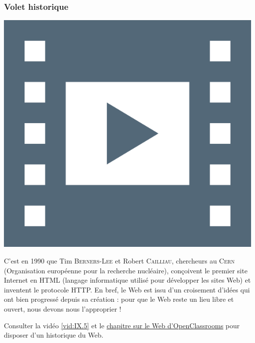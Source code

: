 \subsubsection[Volet historique]{Volet historique}
\label{subsub:IX.2.1.2}

\begin{marginvideo}
	[\label{vid:IX.5}Naissance du Web.]%
	\href{https://pixees.fr/assistez-a-la-naissance-du-web-2/}%
	  {\includegraphics[width=\marginparwidth]{./Images/Pictograms/film-strip-dark-electric-blue.png}}%
\end{marginvideo}

C’est en 1990 que Tim \textsc{Berners-Lee} et Robert \textsc{Cailliau}, chercheurs au \textsc{Cern} (Organisation européenne pour la recherche nucléaire), conçoi\-vent le premier site Internet en HTML (langage informatique utilisé pour développer les sites Web) et inventent le protocole HTTP. En bref, le Web est issu d’un croisement d’idées qui ont bien progressé depuis sa création : pour que le Web reste un lieu libre et ouvert, nous devons nous l'approprier !

Consulter la vidéo \cref{vid:IX.5} et le \href{https://openclassrooms.com/fr/courses/4297411-connecter-le-reseau/4304506-assistez-a-la-naissance-du-web#r-4344123}{chapitre sur le Web d'OpenClassrooms} pour disposer d'un historique du Web. 


